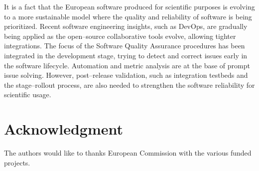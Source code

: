 \documentclass[journal]{IEEEtran}
\begin{document}
It is a fact that the European software produced for scientific purposes is evolving to a more sustainable model where the quality and reliability of software is being prioritized. Recent software engineering insights, such as DevOps, are gradually being applied as the open--source collaborative tools evolve, allowing tighter integrations. The focus of the Software Quality Assurance procedures has been integrated in the development stage, trying to detect and correct issues early in the software lifecycle. Automation and metric analysis are at the base of prompt issue solving. However, post--release validation, such as integration testbeds and the stage--rollout process, are also needed to strengthen the software reliability for scientific usage.


\section*{Acknowledgment}
The authors would like to thanks European Commission with the various funded projects.


\end{document}
